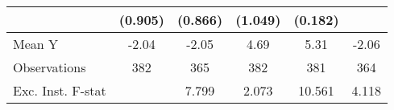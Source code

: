 {\begin{tabular}{l*{5}{c}}
            &     (0.905)         &     (0.866)         &     (1.049)         &     (0.182)         &                     \\
\midrule
Mean Y      &       -2.04         &       -2.05         &        4.69         &        5.31         &       -2.06         \\
Observations&         382         &         365         &         382         &         381         &         364         \\
Exc. Inst. F-stat&                     &       7.799         &       2.073         &      10.561         &       4.118         \\
\bottomrule
\end{tabular}
}
